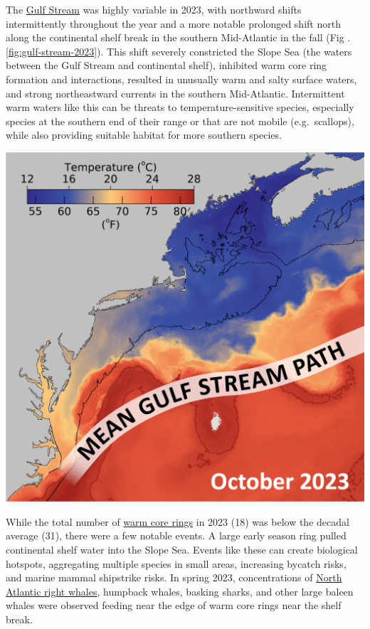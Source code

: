 \documentclass[
  10pt,
]{article}
\let\origfigure\figure
\let\endorigfigure\endfigure
\renewenvironment{figure}[1][2] {
    \expandafter\origfigure\expandafter[H]
} {
    \endorigfigure
}
\begin{document}
The \href{https://noaa-edab.github.io/catalog/gulf-stream-index.html}{Gulf Stream} was highly variable in 2023, with northward shifts intermittently throughout the year and a more notable prolonged shift north along the continental shelf break in the southern Mid-Atlantic in the fall (Fig .\ref{fig:gulf-stream-2023}). This shift severely constricted the Slope Sea (the waters between the Gulf Stream and continental shelf), inhibited warm core ring formation and interactions, resulted in unusually warm and salty surface waters, and strong northeastward currents in the southern Mid-Atlantic. Intermittent warm waters like this can be threats to temperature-sensitive species, especially species at the southern end of their range or that are not mobile (e.g.~scallops), while also providing suitable habitat for more southern species.

\begin{figure}

{\centering \includegraphics[width=0.6\linewidth]{images/MAP-SST-Gulf-Stream} 

}

\caption{Weekly mean sea surface temperature (October 8-10, 2023) with the long-term mean Gulf Stream position. Red lines represent the 26℃) (78.8F) temperature contour.}\label{fig:gulf-stream-2023}
\end{figure}

While the total number of \href{https://noaa-edab.github.io/catalog/warm-core-rings.html}{warm core rings} in 2023 (18) was below the decadal average (31), there were a few notable events. A large early season ring pulled continental shelf water into the Slope Sea. Events like these can create biological hotspots, aggregating multiple species in small areas, increasing bycatch risks, and marine mammal shipstrike risks. In spring 2023, concentrations of \href{https://noaa-edab.github.io/catalog/persistent-annual-hotspots.html?q=hotspo\#persistent-annual-hotspots}{North Atlantic right whales}, humpback whales, basking sharks, and other large baleen whales were observed feeding near the edge of warm core rings near the shelf break.
\end{document}
